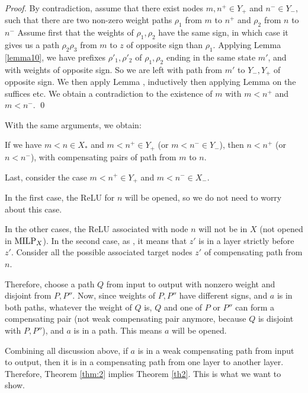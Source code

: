 	\begin{proof}
	By contradiction, assume that there exist nodes $m, n^+ \in Y_+$ and  $n^
	- \in Y_-$, such that there are two non-zero weight paths $\rho_1$ from $m$ to $n^+$ and $\rho_2$ from $n$ to $n^-$ Assume first that the weights of $\rho_1,\rho_2$ have the same sign, 
	in which case it gives us a path $\rho_2 \rho_3$  from $m$ to $z$ of opposite sign than $\rho_1$. Applying Lemma \ref{lemma10}, we have prefixes $\rho'_1,\rho'_2$ of $\rho_1,\rho_2$ ending in the same state $m'$, and with weights of opposite sign.
	So we are left with path from $m'$ to $Y_-,Y_+$ of opposite sign. 
	We then apply Lemma \label{lemma11}, inductively then applying Lemma \label{lemma10} on the suffices etc. We obtain a contradiction to the existence of $m$ with $m<n^+$ and $m<n^-$. \qed
	\end{proof}
	
	
	With the same arguments, we obtain:
	
	\begin{lemma}
	If we have $m<n \in X_*$ and $m < n^+ \in Y_+$ (or $m < n^- \in Y_-$),
	then $n < n^+$ (or $n < n^-$), with compensating pairs of path from $m$ to $n$.
	\end{lemma}
	
	Last, consider the case $m<n^+ \in Y_+$ and $m < n^- \in X_-$.
	



In the first case, the ReLU for $n$ will be opened, so we do not need to worry about this case.
			
			In the other cases, the ReLU associated with node $n$ will not be in $X$ 
			(not opened in ${\textrm{MILP}}_X$).
			In the second case, as 
			, it means that $z'$ is in a layer strictly before $z'$.
			Consider all the possible associated target nodes $z'$ of compensating path from $n$.

			
			Therefore, choose a path $Q$ from input to output with nonzero weight and disjoint from $P,P''$. Now, since weights of $P,P''$ have different signs, and $a$ is in both paths, whatever the weight of $Q$ is, $Q$ and one of  $P$ or $P''$ can form a compensating pair (not weak compensating pair anymore, because $Q$ is disjoint with $P,P''$), and $a$ is in a path. This means $a$ will be opened.
			
			Combining all discussion above, if $a$ is in a weak compensating path from input to output, then it is in a compensating path from one layer to another layer. Therefore, Theorem \ref{thm:2} implies Theorem \ref{th2}. This is what we want to show.
			\fi
			

